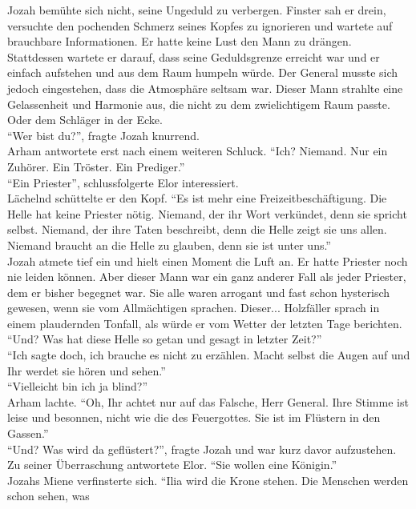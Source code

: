 Jozah bemühte sich nicht, seine Ungeduld zu verbergen. Finster sah er drein, versuchte den 
pochenden Schmerz seines Kopfes zu ignorieren und wartete auf brauchbare Informationen. Er hatte 
keine Lust den Mann zu drängen. Stattdessen wartete er darauf, dass seine Geduldsgrenze erreicht 
war und er einfach aufstehen und aus dem Raum humpeln würde. Der General musste sich jedoch 
eingestehen, dass die Atmosphäre seltsam war. Dieser Mann strahlte eine Gelassenheit und Harmonie 
aus, die nicht zu dem zwielichtigem Raum passte. Oder dem Schläger in der Ecke.\\
``Wer bist du?'', fragte Jozah knurrend.\\
Arham antwortete erst nach einem weiteren Schluck. ``Ich? Niemand. Nur ein Zuhörer. Ein Tröster. 
Ein Prediger.''\\
``Ein Priester'', schlussfolgerte Elor interessiert.\\
Lächelnd schüttelte er den Kopf. ``Es ist mehr eine Freizeitbeschäftigung. Die Helle hat keine Priester nötig. Niemand, der ihr Wort 
verkündet, denn sie spricht selbst. Niemand, der ihre Taten beschreibt, denn die Helle zeigt sie 
uns allen. Niemand braucht an die Helle zu glauben, denn sie ist unter uns.''\\
Jozah atmete tief ein und hielt einen Moment die Luft an. Er hatte Priester noch nie leiden können. 
Aber dieser Mann war ein ganz anderer Fall als jeder Priester, dem er bisher begegnet war. Sie alle 
waren arrogant und fast schon hysterisch gewesen, wenn sie vom Allmächtigen sprachen. Dieser... 
Holzfäller sprach in einem plaudernden Tonfall, als würde er vom Wetter der letzten Tage 
berichten.\\
``Und? Was hat diese Helle so getan und gesagt in letzter Zeit?''\\
``Ich sagte doch, ich brauche es nicht zu erzählen. Macht selbst die Augen auf und Ihr werdet sie 
hören und sehen.''\\
``Vielleicht bin ich ja blind?''\\
Arham lachte. ``Oh, Ihr achtet nur auf das Falsche, Herr General. Ihre Stimme ist leise und 
besonnen, nicht wie die des Feuergottes. Sie ist im Flüstern in den Gassen.''\\
``Und? Was wird da geflüstert?'', fragte Jozah und war kurz davor aufzustehen.\\
Zu seiner Überraschung antwortete Elor. ``Sie wollen eine Königin.''\\
Jozahs Miene verfinsterte sich. ``Ilia wird die Krone stehen. Die Menschen werden schon sehen, was 
